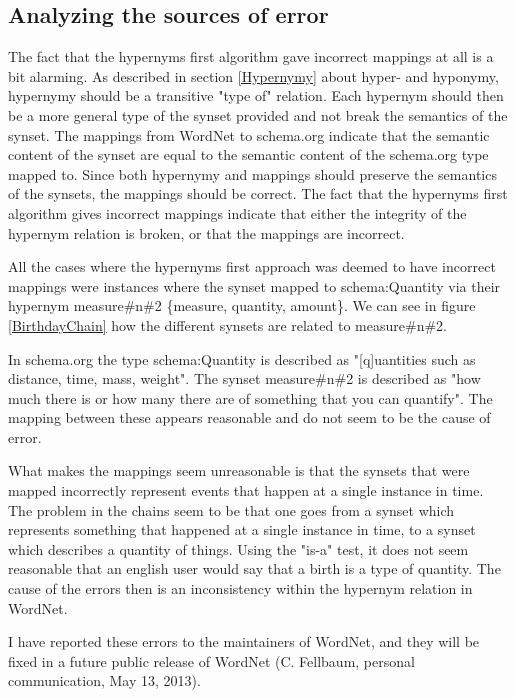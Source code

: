 \subsection{Analyzing the sources of error}
The fact that the hypernyms first algorithm gave incorrect mappings at all is a bit alarming.
As described in section \ref{Hypernymy} about hyper- and hyponymy, hypernymy should be a transitive "type of" relation.
Each hypernym should then be a more general type of the synset provided and not break the semantics of the synset.
The mappings from WordNet to schema.org indicate that the semantic content of the synset are equal to the
semantic content of the schema.org type mapped to.
Since both hypernymy and mappings should preserve the semantics of the synsets, the mappings should be correct.
The fact that the hypernyms first algorithm gives incorrect mappings indicate that either the integrity of the hypernym relation is broken,
or that the mappings are incorrect.

All the cases where the hypernyms first approach was deemed to have incorrect mappings were instances where the synset
mapped to schema:Quantity via their hypernym measure\#n\#2 \{measure, quantity, amount\}.
We can see in figure \ref{BirthdayChain} how the different synsets are related to measure\#n\#2.


In schema.org the type schema:Quantity is described as "[q]uantities such as distance, time, mass, weight".
The synset measure\#n\#2 is described as "how much there is or how many there are of something that you can quantify".
The mapping between these appears reasonable and do not seem to be the cause of error.

What makes the mappings seem unreasonable is that the synsets that were mapped incorrectly represent events that happen at a single instance in time.
The problem in the chains seem to be that one goes from a synset which represents something that happened at a
single instance in time, to a synset which describes a quantity of things.
Using the "is-a" test, it does not seem reasonable that an english user would say that a birth is a type of quantity.
The cause of the errors then is an inconsistency within the hypernym relation in WordNet.

I have reported these errors to the maintainers of WordNet, and they will be fixed in a future public release of WordNet
(C. Fellbaum, personal communication, May 13, 2013).

